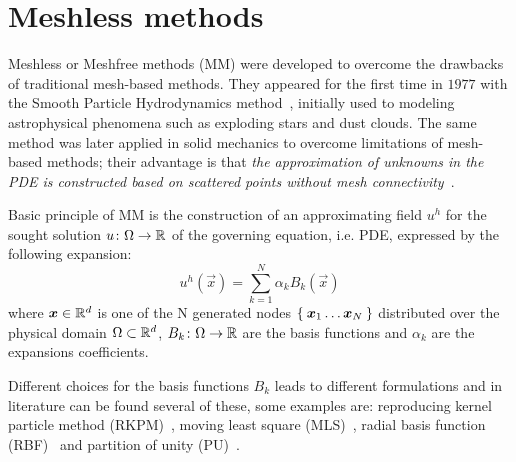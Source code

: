 \chapter{Meshless methods}\label{chap:lorem}
\label{chap:meshless_methods}

Meshless or Meshfree methods (MM) were developed to overcome the drawbacks of traditional mesh-based methods.
They appeared for the first time in $1977$ with the Smooth Particle Hydrodynamics method~\cite{Belytschko:meshless_overview}, initially used to modeling astrophysical phenomena such as exploding stars and dust clouds. The same method was later applied in solid mechanics to overcome limitations of mesh-based methods; their advantage is that \textit{the approximation of unknowns in the PDE is constructed based on scattered points without mesh connectivity}~\cite{Chen:meshless_overview_after_20_years}.

Basic principle of MM is the construction of an approximating field $u^{h}$ for the sought solution $u\colon\Omega\to\mathbb{R}$ of the governing equation, i.e. PDE, expressed by the following expansion:
\begin{equation}
	\label{eqn:general_u_discretization}
	u^{h}(\vec{x}) = \sum_{k= 1}^{N} {\alpha_k B_k(\vec{x})}
\end{equation}
where $\boldsymbol{x} \in \mathbb{R}^{d}$ is one of the N generated nodes $\Set{\boldsymbol{x}_1 \dots \boldsymbol{x}_N}$ distributed over the physical domain $\Omega \subset \mathbb{R}^{d}$, $B_k\colon\Omega\to\mathbb{R}$ are the basis functions and $\alpha_k$ are the expansions coefficients.

Different choices for the basis functions $B_k$ leads to different formulations and in literature can be found several of these, some examples are:  reproducing kernel particle method (RKPM)~\cite{Liu:RKPM}, moving least square (MLS)~\cite{Lancaster:MLS}, radial basis function (RBF)~\cite{Kansa:RBF_1, Kansa:RBF_2} and partition of unity (PU)~\cite{Schweitzer:PU}.

